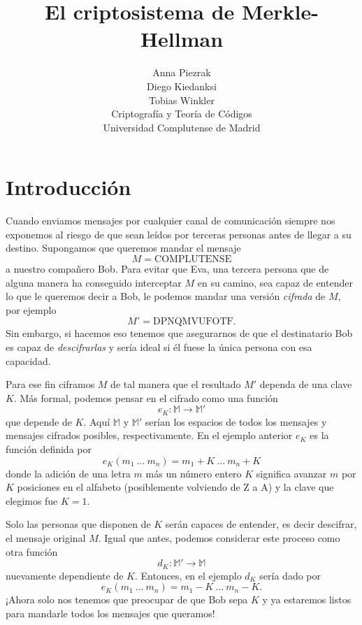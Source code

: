 \documentclass[12pt]{article}
\begin{document}
 
 
\title{El criptosistema de Merkle-Hellman}
\author{Anna Piezrak\\Diego Kiedanksi\\Tobias Winkler\\Criptografía y Teoría de Códigos\\Universidad Complutense de Madrid} %
 
\maketitle

\section{Introducción}

Cuando enviamos mensajes por cualquier canal de comunicación siempre nos exponemos al riesgo de que sean leídos por terceras personas antes de llegar a su destino. Supongamos que queremos mandar el mensaje
$$M = \text{COMPLUTENSE}$$
a nuestro compañero Bob. Para evitar que Eva, una tercera persona que de alguna manera ha conseguido interceptar $M$ en su camino, sea capaz de entender lo que le queremos decir a Bob, le podemos mandar una versión \emph{cifrada} de $M$, por ejemplo
$$M' = \text{DPNQMVUFOTF}.$$
Sin embargo, si hacemos eso tenemos que asegurarnos de que el destinatario Bob es capaz de \emph{descifrarlas} y sería ideal si él fuese la única persona con esa capacidad.

Para ese fin ciframos $M$ de tal manera que el resultado $M'$ dependa de una clave $K$. Más formal, podemos pensar en el cifrado como una función
$$e_K : \mathbb{M} \rightarrow \mathbb{M}'$$
que depende de $K$. Aquí $\mathbb{M}$ y $\mathbb{M}'$ serían los espacios de todos los mensajes y mensajes cifrados posibles, respectivamente. En el ejemplo anterior $e_K$ es la función definida por
$$e_K(m_1\ ...\ m_n) = m_1 + K\ ...\ m_n+K$$
donde la adición de una letra $m$ más un número entero $K$ significa avanzar $m$ por $K$ posiciones en el alfabeto (posiblemente volviendo de Z a A) y la clave que elegimos fue $K = 1$.

Solo las personas que disponen de $K$ serán capaces de entender, es decir descifrar, el mensaje original $M$. Igual que antes, podemos considerar este proceso como otra función
$$d_K : \mathbb{M}' \rightarrow \mathbb{M}$$
nuevamente dependiente de $K$. Entonces, en el ejemplo $d_K$ sería dado por
$$e_K(m_1\ ...\ m_n) = m_1 - K\ ...\ m_n - K.$$
¡Ahora solo nos tenemos que preocupar de que Bob sepa $K$ y ya estaremos listos para mandarle todos los mensajes que queramos!
\end{document}
